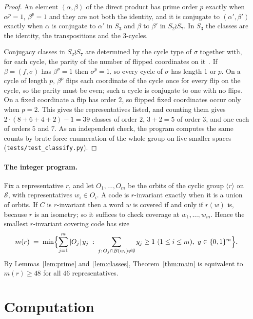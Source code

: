 \documentclass[11pt]{article}
\theoremstyle{definition}
\theoremstyle{remark}
\newcommand{\Sp}{\mathcal{S}}
\begin{document}
\begin{proof}
An element $(\alpha,\beta)$ of the direct product has prime order $p$ exactly when
$\alpha^p=1$, $\beta^p=1$ and they are not both the identity, and it is conjugate to
$(\alpha',\beta')$ exactly when $\alpha$ is conjugate to $\alpha'$ in $S_3$ and $\beta$ to
$\beta'$ in $S_2\wr S_7$. In $S_3$ the classes are the identity, the transpositions and the
$3$-cycles.

Conjugacy classes in $S_2\wr S_7$ are determined by the cycle type of $\sigma$ together with,
for each cycle, the parity of the number of flipped coordinates on it~\cite[Ch.~4]{james-kerber}.
If $\beta=(f,\sigma)$ has $\beta^p=1$ then $\sigma^p=1$, so every cycle of $\sigma$ has length $1$
or $p$. On a cycle of length $p$, $\beta^p$ flips each coordinate of the cycle once for every
flip on the cycle, so the parity must be even; such a cycle is conjugate to one with no flips. On
a fixed coordinate a flip has order $2$, so flipped fixed coordinates occur only when $p=2$.
This gives the representatives listed, and counting them gives
$2\cdot(8+6+4+2)-1=39$ classes of order $2$, $3+2=5$ of order $3$, and one each of orders $5$
and $7$. As an independent check, the program computes the same counts by brute-force
enumeration of the whole group on five smaller spaces (\texttt{tests/test\_classify.py}).
\end{proof}

\paragraph{The integer program.} Fix a representative $r$, and let $O_1,\dots,O_m$ be the orbits
of the cyclic group $\langle r\rangle$ on $\Sp$, with representatives $w_i\in O_i$. A code is
$r$-invariant exactly when it is a union of orbits. If $C$ is $r$-invariant then a word $w$ is
covered if and only if $r(w)$ is, because $r$ is an isometry; so it suffices to check coverage
at $w_1,\dots,w_m$. Hence the smallest $r$-invariant covering code has size
\begin{equation}\label{eq:ilp}
m(r) \;=\; \min\Bigl\{ \sum_{j=1}^m |O_j|\,y_j \;:\;
\sum_{j:\,O_j\cap B(w_i)\neq\emptyset} y_j \ge 1 \ (1\le i\le m),\ y\in\{0,1\}^m \Bigr\}.
\end{equation}
By Lemmas~\ref{lem:prime} and~\ref{lem:classes}, Theorem~\ref{thm:main} is equivalent to
$m(r)\ge 48$ for all $46$ representatives.

\section{Computation}\label{sec:computation}
\end{document}
